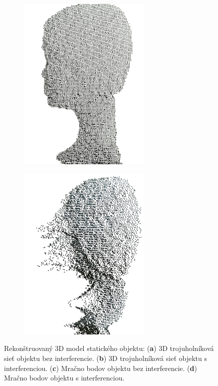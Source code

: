 \begin{figure}[h]
\begin{subfigure}[b]{0.24\textwidth}
		\caption{}
		\label{fig:3dm:a}
	\end{subfigure}
	\hfill
	\begin{subfigure}[b]{0.24\textwidth}
		\centering
		\includegraphics[width=0.7\textwidth]{figures/3dmodels-d.png}
		\caption{}
		\label{fig:3dm:d}
	\end{subfigure}
	\hfill
	\begin{subfigure}[b]{0.24\textwidth}
		\centering
		\includegraphics[width=0.7\textwidth]{figures/3dmodels-b.png}
		\caption{}
		\label{fig:3dm:c}
	\end{subfigure}
	\caption{Rekonštruovaný 3D model statického objektu: (\textbf{a}) 3D trojuholníková sieť objektu bez interferencie. (\textbf{b}) 3D trojuholníková sieť objektu s interferenciou. (\textbf{c}) Mračno bodov objektu bez interferencie. (\textbf{d}) Mračno bodov objektu s interferenciou.}
	\label{fig:3dmodel}
\end{figure}

